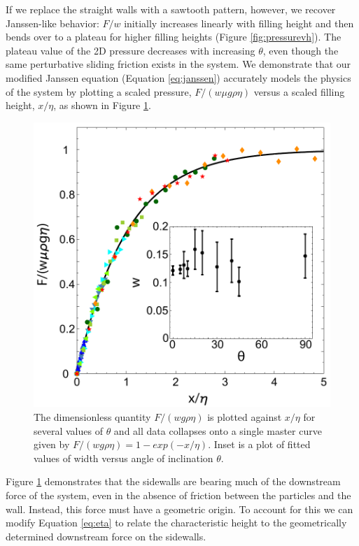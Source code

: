 If we replace the straight walls with a sawtooth pattern, however, we recover Janssen-like behavior: $F/w$ initially increases linearly with filling height and then bends over to a plateau for higher filling heights (Figure \ref{fig:pressurevh}).  The plateau value of the 2D pressure decreases with increasing $\theta$, even though the same perturbative sliding friction exists in the system.  We demonstrate that our modified Janssen equation (Equation \ref{eq:janssen}) accurately models the physics of the system by plotting a scaled pressure, $F/(w\mu g\rho\eta)$ versus a scaled filling height, $x/\eta$, as shown in Figure \ref{fig:collapse}.
%
\begin{figure}
	\includegraphics[width=\textwidth]{Figures/chapter2/collapse}
	\caption{The dimensionless quantity $F/(wg\rho\eta)$ is plotted against $x/\eta$ for several values of $\theta$ and all data collapses onto a single master curve given by $ F/(wg\rho\eta) = 1 - exp(-x/\eta)$. Inset is a plot of fitted values of width versus angle of inclination $\theta$.}
	\label{fig:collapse}
\end{figure}
%

Figure \ref{fig:collapse} demonstrates that the sidewalls are bearing much of the downstream force of the system, even in the absence of friction between the particles and the wall.  Instead, this force must have a geometric origin.  To account for this we can modify Equation \ref{eq:eta} to relate the characteristic height to the geometrically determined downstream force on the sidewalls.

